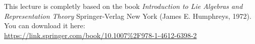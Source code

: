
This lecture is completly based on the book
\textit{Introduction to Lie Algebras and Representation Theory}
Springer-Verlag New York (James E. Humphreys, 1972). You can download it here:\\
\url{https://link.springer.com/book/10.1007\%2F978-1-4612-6398-2}
